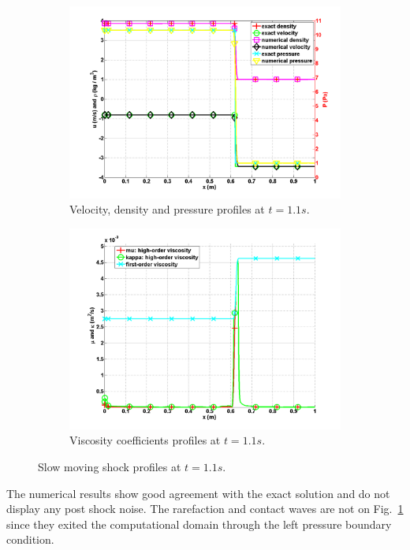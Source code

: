 \documentclass[preprint,10pt]{elsarticle}
\newcommand{\fig}[1]{Fig.~\ref{#1}}                      %
\begin{document}
\begin{figure}[H]
        \centering
        \begin{subfigure}[b]{0.495\textwidth}
                \centering
                \includegraphics[width=\textwidth]{SlowMovingShock_density_velocity_pressure_profiles.png}
                \caption{Velocity, density and pressure profiles at $t=1.1s$.}
                \label{fig:profiles_sms}
        \end{subfigure}%
        \begin{subfigure}[b]{0.495\textwidth}
                \centering
                \includegraphics[width=\textwidth]{SlowMovingShock_viscosity.png}
                \caption{Viscosity coefficients profiles at $t=1.1s$.}
                \label{fig:viscosity_sms}
        \end{subfigure} 
        \caption{Slow moving shock profiles at $t=1.1s$.}\label{fig:low_moving_shock}
\end{figure} 
The numerical results show good agreement with the exact solution and do not display any post shock noise. The rarefaction and contact waves are not on \fig{fig:profiles_sms} since they exited the computational domain through the left pressure boundary condition.
\end{document}
